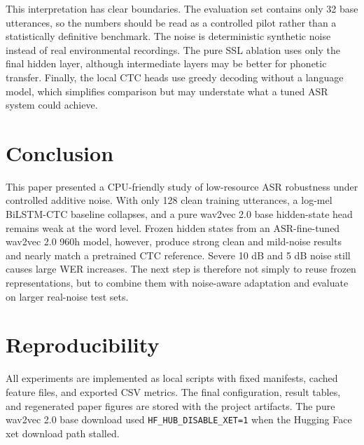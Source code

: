 \documentclass{article}
\begin{document}
This interpretation has clear boundaries. The evaluation set contains only 32 base utterances, so the numbers should be read as a controlled pilot rather than a statistically definitive benchmark. The noise is deterministic synthetic noise instead of real environmental recordings. The pure SSL ablation uses only the final hidden layer, although intermediate layers may be better for phonetic transfer. Finally, the local CTC heads use greedy decoding without a language model, which simplifies comparison but may understate what a tuned ASR system could achieve.

\section{Conclusion}
\label{sec:conclusion}

This paper presented a CPU-friendly study of low-resource ASR robustness under controlled additive noise. With only 128 clean training utterances, a log-mel BiLSTM-CTC baseline collapses, and a pure wav2vec 2.0 base hidden-state head remains weak at the word level. Frozen hidden states from an ASR-fine-tuned wav2vec 2.0 960h model, however, produce strong clean and mild-noise results and nearly match a pretrained CTC reference. Severe 10 dB and 5 dB noise still causes large WER increases. The next step is therefore not simply to reuse frozen representations, but to combine them with noise-aware adaptation and evaluate on larger real-noise test sets.

\section{Reproducibility}
\label{sec:repro}

All experiments are implemented as local scripts with fixed manifests, cached feature files, and exported CSV metrics. The final configuration, result tables, and regenerated paper figures are stored with the project artifacts. The pure wav2vec 2.0 base download used \texttt{HF\_HUB\_DISABLE\_XET=1} when the Hugging Face xet download path stalled.

\clearpage
\raggedbottom


\end{document}
